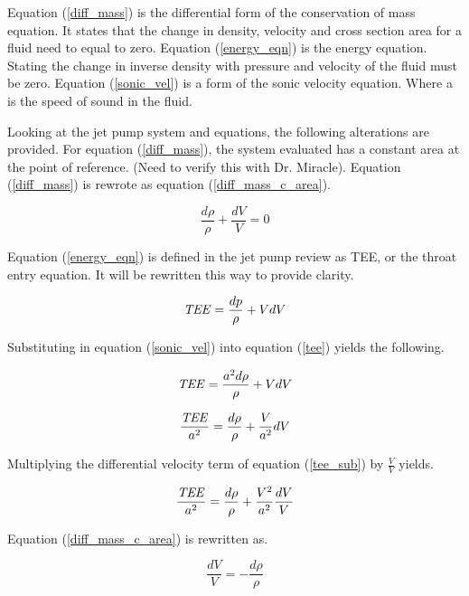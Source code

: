 \documentclass{article}
\newcommand\Tee{\mbox{\textit{TEE}}}  %
\begin{document}
Equation (\ref{diff_mass}) is the differential form of the conservation of mass equation. It states that the change in density, velocity and cross section area for a fluid need to equal to zero. Equation (\ref{energy_eqn}) is the energy equation. Stating the change in inverse density with pressure and velocity of the fluid must be zero. Equation (\ref{sonic_vel}) is a form of the sonic velocity equation. Where a is the speed of sound in the fluid. 

Looking at the jet pump system and equations, the following alterations are provided. For equation (\ref{diff_mass}), the system evaluated has a constant area at the point of reference. (Need to verify this with Dr. Miracle). Equation (\ref{diff_mass}) is rewrote as equation (\ref{diff_mass_c_area}).

\begin{equation}
\frac{d\rho}{\rho} + \frac{dV}{V} = 0
\label{diff_mass_c_area}
\end{equation}

Equation (\ref{energy_eqn}) is defined in the jet pump review as TEE, or the throat entry equation. It will be rewritten this way to provide clarity.

\begin{equation}
    \Tee = \frac{dp}{\rho} + VdV
\label{tee}
\end{equation}

Substituting in equation (\ref{sonic_vel}) into equation (\ref{tee}) yields the following.

\begin{equation}
    \Tee = \frac{a^2d\rho}{\rho} + VdV
\end{equation}

\begin{equation}
    \frac{\Tee}{a^2} = \frac{d\rho}{\rho} + \frac{V}{a^2}dV
    \label{tee_sub}
\end{equation}

Multiplying the differential velocity term of equation (\ref{tee_sub}) by $\frac{V}{V}$ yields.

\begin{equation}
    \frac{\Tee}{a^2} = \frac{d\rho}{\rho} + \frac{V^2}{a^2}\frac{dV}{V}
    \label{tee_sub2}
\end{equation}

Equation (\ref{diff_mass_c_area}) is rewritten as.

\begin{equation}
    \frac{dV}{V} = - \frac{d\rho}{\rho}
\end{equation}
\end{document}
